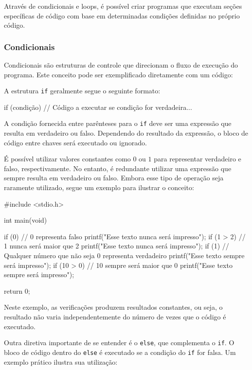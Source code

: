Através de condicionais e loops, é possível criar programas que executam 
seções específicas de código com base em determinadas condições definidas 
no próprio código.

\subsubsection{Condicionais}

Condicionais são estruturas de controle que direcionam o fluxo de execução 
do programa. Este conceito pode ser exemplificado diretamente com um código:

A estrutura \texttt{if} geralmente segue o seguinte formato:

\begin{excode}
    if (condição) {
        // Código a executar se condição for verdadeira...
    }
\end{excode}

A condição fornecida entre parênteses para o \texttt{if} deve ser uma 
expressão que resulta em verdadeiro ou falso. Dependendo do resultado da 
expressão, o bloco de código entre chaves será executado ou ignorado.

É possível utilizar valores constantes como \(0\) ou \(1\) para representar 
verdadeiro e falso, respectivamente. No entanto, é redundante utilizar uma expressão que sempre resulta em verdadeiro ou falso. Embora esse tipo de 
operação seja raramente utilizado, segue um exemplo para ilustrar o conceito:

\begin{excode}
    #include <stdio.h>

    int main(void)
    {
        if (0) { // 0 representa falso printf("Esse texto nunca será impresso\n");
        }
        if (1 > 2) { // 1 nunca será maior que 2
            printf("Esse texto nunca será impresso\n");
        }
        if (1) { // Qualquer número que não seja 0 representa verdadeiro
            printf("Esse texto sempre será impresso\n");
        }
        if (10 > 0) { // 10 sempre será maior que 0
            printf("Esse texto sempre será impresso\n");
        }
        
        return 0;
    }
\end{excode}

Neste exemplo, as verificações produzem resultados constantes, ou seja, o 
resultado não varia independentemente do número de vezes que o código é 
executado.

Outra diretiva importante de se entender é o \texttt{else}, que complementa o 
\texttt{if}. O bloco de código dentro do \texttt{else} é executado se a 
condição do \texttt{if} for falsa. Um exemplo prático ilustra sua utilização:

